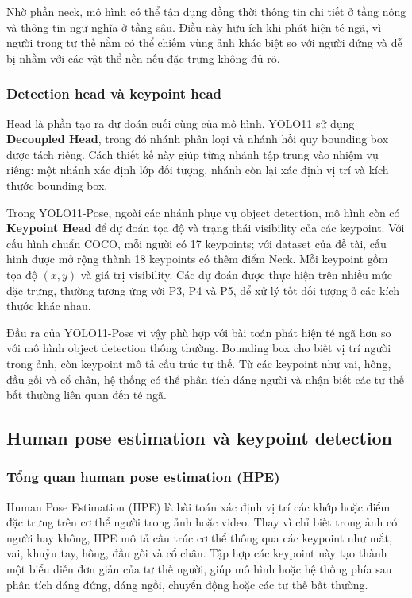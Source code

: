 \documentclass[12pt, a4paper]{article}
\begin{document}
Nhờ phần neck, mô hình có thể tận dụng đồng thời thông tin chi tiết ở tầng nông và thông tin ngữ nghĩa ở tầng sâu.
Điều này hữu ích khi phát hiện té ngã, vì người trong tư thế nằm có thể chiếm vùng ảnh khác biệt so với người đứng và dễ bị nhầm với các vật thể nền nếu đặc trưng không đủ rõ.

\subsubsection{Detection head và keypoint head}
Head là phần tạo ra dự đoán cuối cùng của mô hình.
YOLO11 sử dụng \textbf{Decoupled Head}, trong đó nhánh phân loại và nhánh hồi quy bounding box được tách riêng.
Cách thiết kế này giúp từng nhánh tập trung vào nhiệm vụ riêng: một nhánh xác định lớp đối tượng, nhánh còn lại xác định vị trí và kích thước bounding box.

Trong YOLO11-Pose, ngoài các nhánh phục vụ object detection, mô hình còn có \textbf{Keypoint Head} để dự đoán tọa độ và trạng thái visibility của các keypoint.
Với cấu hình chuẩn COCO, mỗi người có 17 keypoints; với dataset của đề tài, cấu hình được mở rộng thành 18 keypoints có thêm điểm Neck.
Mỗi keypoint gồm tọa độ $(x, y)$ và giá trị visibility.
Các dự đoán được thực hiện trên nhiều mức đặc trưng, thường tương ứng với P3, P4 và P5, để xử lý tốt đối tượng ở các kích thước khác nhau.

Đầu ra của YOLO11-Pose vì vậy phù hợp với bài toán phát hiện té ngã hơn so với mô hình object detection thông thường.
Bounding box cho biết vị trí người trong ảnh, còn keypoint mô tả cấu trúc tư thế.
Từ các keypoint như vai, hông, đầu gối và cổ chân, hệ thống có thể phân tích dáng người và nhận biết các tư thế bất thường liên quan đến té ngã.

\subsection{Human pose estimation và keypoint detection}

\subsubsection{Tổng quan human pose estimation (HPE)}
Human Pose Estimation (HPE) là bài toán xác định vị trí các khớp hoặc điểm đặc trưng trên cơ thể người trong ảnh hoặc video.
Thay vì chỉ biết trong ảnh có người hay không, HPE mô tả cấu trúc cơ thể thông qua các keypoint như mắt, vai, khuỷu tay, hông, đầu gối và cổ chân.
Tập hợp các keypoint này tạo thành một biểu diễn đơn giản của tư thế người, giúp mô hình hoặc hệ thống phía sau phân tích dáng đứng, dáng ngồi, chuyển động hoặc các tư thế bất thường.
\end{document}
